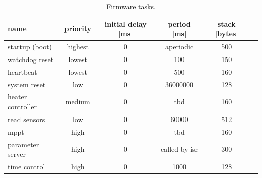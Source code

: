 \begin{table}[!h]
    \centering
    \begin{tabular}{lccccc}
        \toprule[1.5pt]
        \textbf{name}          & \textbf{priority} & \textbf{initial delay [ms]} & \textbf{period [ms]} & \textbf{stack [bytes]} \\
        \midrule
        startup (boot)         & highest           & 0                           & aperiodic            & 500                    \\
        watchdog reset         & lowest            & 0                           & 100                  & 150                    \\
        heartbeat              & lowest            & 0                           & 500                  & 160                    \\
        system reset           & low               & 0                           & 36000000             & 128                    \\
        heater controller      & medium            & 0                           & tbd                  & 160                    \\
        read sensors           & low               & 0                           & 60000                & 512                    \\
        mppt                   & high              & 0                           & tbd                  & 160                    \\
        parameter server       & high              & 0      & called by isr\nomenclature{\textbf{isr}}{\textit{interrupt service routine.}}   & 300 \\
        time control           & high              & 0                           & 1000                 & 128                    \\
        \bottomrule[1.5pt]
    \end{tabular}
    \caption{Firmware tasks.}
    \label{tab:firmware-tasks}
\end{table}

